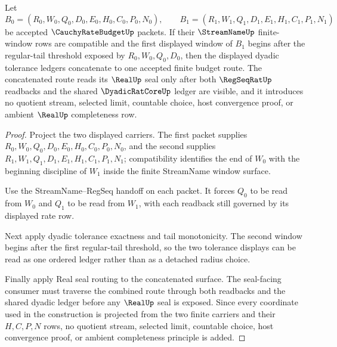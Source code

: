 \begin{theorem}
\label{thm:cauchy-rate-budget-window-concatenation}
Let
$$
B_0=(R_0,W_0,Q_0,D_0,E_0,H_0,C_0,P_0,N_0),
\qquad
B_1=(R_1,W_1,Q_1,D_1,E_1,H_1,C_1,P_1,N_1)
$$
be accepted $\CauchyRateBudgetUp$ packets. If their $\StreamNameUp$ finite-window rows are compatible and the first displayed window of $B_1$ begins after the regular-tail threshold exposed by $R_0,W_0,Q_0,D_0$, then the displayed dyadic tolerance ledgers concatenate to one accepted finite budget route. The concatenated route reads its $\RealUp$ seal only after both $\RegSeqRatUp$ readbacks and the shared $\DyadicRatCoreUp$ ledger are visible, and it introduces no quotient stream, selected limit, countable choice, host convergence proof, or ambient $\RealUp$ completeness row.
\end{theorem}
\begin{proof}
Project the two displayed carriers. The first packet supplies $R_0,W_0,Q_0,D_0,E_0,H_0,C_0,P_0,N_0$, and the second supplies $R_1,W_1,Q_1,D_1,E_1,H_1,C_1,P_1,N_1$; compatibility identifies the end of $W_0$ with the beginning discipline of $W_1$ inside the finite StreamName window surface.

Use the StreamName--RegSeq handoff on each packet. It forces $Q_0$ to be read from $W_0$ and $Q_1$ to be read from $W_1$, with each readback still governed by its displayed rate row.

Next apply dyadic tolerance exactness and tail monotonicity. The second window begins after the first regular-tail threshold, so the two tolerance displays can be read as one ordered ledger rather than as a detached radius choice.

Finally apply Real seal routing to the concatenated surface. The seal-facing consumer must traverse the combined route through both readbacks and the shared dyadic ledger before any $\RealUp$ seal is exposed. Since every coordinate used in the construction is projected from the two finite carriers and their $H,C,P,N$ rows, no quotient stream, selected limit, countable choice, host convergence proof, or ambient completeness principle is added.
\end{proof}



